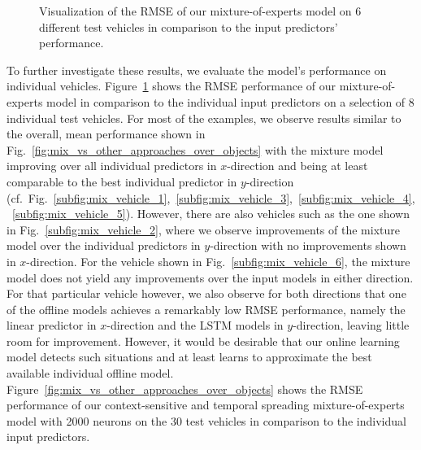 \begin{figure}[t]
    \caption{Visualization of the \ac{RMSE} of our mixture-of-experts model on \num{6} different test vehicles in comparison to the input predictors' performance.}
    \label{fig:mix_vehicle_examples}
\end{figure}

To further investigate these results, we evaluate the  model's performance on individual vehicles.
Figure~\ref{fig:mix_vehicle_examples} shows the \ac{RMSE} performance of our mixture-of-experts model in comparison to the individual input predictors on a selection of \num{8} individual test vehicles.
For most of the examples, we observe results similar to the overall, mean performance shown in Fig.~\ref{fig:mix_vs_other_approaches_over_objects} with the mixture model improving over all individual predictors in $x$-direction and being at least comparable to the best individual predictor in $y$-direction (cf.\ Fig.~\ref{subfig:mix_vehicle_1},~\ref{subfig:mix_vehicle_3},~\ref{subfig:mix_vehicle_4},~\ref{subfig:mix_vehicle_5}).
However, there are also vehicles such as the one shown in Fig.~\ref{subfig:mix_vehicle_2}, where we observe improvements of the mixture model over the individual predictors in $y$-direction with no improvements shown in $x$-direction.
For the vehicle shown in Fig.~\ref{subfig:mix_vehicle_6}, the mixture model does not yield any improvements over the input models in either direction.
For that particular vehicle however, we also observe for both directions that one of the offline models achieves a remarkably low \ac{RMSE} performance, namely the linear predictor in $x$-direction and the \ac{LSTM} models in $y$-direction, leaving little room for improvement.
However, it would be desirable that our online learning model detects such situations and at least learns to approximate the best available individual offline model.
Figure~\ref{fig:mix_vs_other_approaches_over_objects} shows the \ac{RMSE} performance of our context-sensitive and temporal spreading mixture-of-experts model with \num{2000} neurons on the \num{30} test vehicles in comparison to the individual input predictors.

